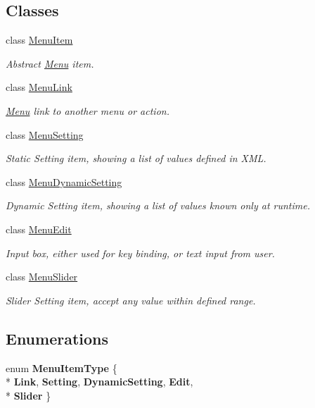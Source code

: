 \subsection*{Classes}
\begin{DoxyCompactItemize}
\item 
class \hyperlink{classMenuItem}{Menu\+Item}
\begin{DoxyCompactList}\small\item\em Abstract \hyperlink{classMenu}{Menu} item. \end{DoxyCompactList}\item 
class \hyperlink{classMenuLink}{Menu\+Link}
\begin{DoxyCompactList}\small\item\em \hyperlink{classMenu}{Menu} link to another menu or action. \end{DoxyCompactList}\item 
class \hyperlink{classMenuSetting}{Menu\+Setting}
\begin{DoxyCompactList}\small\item\em Static Setting item, showing a list of values defined in X\+ML. \end{DoxyCompactList}\item 
class \hyperlink{classMenuDynamicSetting}{Menu\+Dynamic\+Setting}
\begin{DoxyCompactList}\small\item\em Dynamic Setting item, showing a list of values known only at runtime. \end{DoxyCompactList}\item 
class \hyperlink{classMenuEdit}{Menu\+Edit}
\begin{DoxyCompactList}\small\item\em Input box, either used for key binding, or text input from user. \end{DoxyCompactList}\item 
class \hyperlink{classMenuSlider}{Menu\+Slider}
\begin{DoxyCompactList}\small\item\em Slider Setting item, accept any value within defined range. \end{DoxyCompactList}\end{DoxyCompactItemize}
\subsection*{Enumerations}
\begin{DoxyCompactItemize}
\item 
enum {\bfseries Menu\+Item\+Type} \{ \\*
{\bfseries Link}, 
{\bfseries Setting}, 
{\bfseries Dynamic\+Setting}, 
{\bfseries Edit}, 
\\*
{\bfseries Slider}
 \}\hypertarget{MenuItem_8hh_a0014b68cdf9686458deff56691368317}{}\label{MenuItem_8hh_a0014b68cdf9686458deff56691368317}

\end{DoxyCompactItemize}


